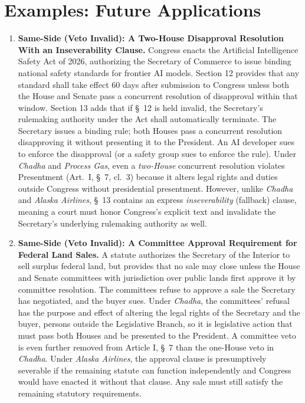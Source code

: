 \documentclass[12pt]{article}
\begin{document}
\section{Examples: Future Applications}
\begin{enumerate}

\item \textbf{Same-Side (Veto Invalid): A Two-House Disapproval Resolution With an Inseverability Clause.} Congress enacts the Artificial Intelligence Safety Act of 2026, authorizing the Secretary of Commerce to issue binding national safety standards for frontier AI models. Section 12 provides that any standard shall take effect 60 days after submission to Congress unless both the House and Senate pass a concurrent resolution of disapproval within that window. Section 13 adds that if \S~12 is held invalid, the Secretary's rulemaking authority under the Act shall automatically terminate. The Secretary issues a binding rule; both Houses pass a concurrent resolution disapproving it without presenting it to the President. An AI developer sues to enforce the disapproval (or a safety group sues to enforce the rule). Under \textit{Chadha} and \textit{Process Gas}, even a \emph{two-House} concurrent resolution violates Presentment (Art.~I, \S~7, cl.~3) because it alters legal rights and duties outside Congress without presidential presentment. However, unlike \textit{Chadha} and \textit{Alaska Airlines}, \S~13 contains an express \emph{inseverability} (fallback) clause, meaning a court must honor Congress's explicit text and invalidate the Secretary's underlying rulemaking authority as well.

\item \textbf{Same-Side (Veto Invalid): A Committee Approval Requirement for Federal Land Sales.} A statute authorizes the Secretary of the Interior to sell surplus federal land, but provides that no sale may close unless the House and Senate committees with jurisdiction over public lands first approve it by committee resolution. The committees refuse to approve a sale the Secretary has negotiated, and the buyer sues. Under \textit{Chadha}, the committees' refusal has the purpose and effect of altering the legal rights of the Secretary and the buyer, persons outside the Legislative Branch, so it is legislative action that must pass both Houses and be presented to the President. A committee veto is even further removed from Article I, \S~7 than the one-House veto in \textit{Chadha}. Under \textit{Alaska Airlines}, the approval clause is presumptively severable if the remaining statute can function independently and Congress would have enacted it without that clause. Any sale must still satisfy the remaining statutory requirements.


\end{enumerate}
\end{document}
